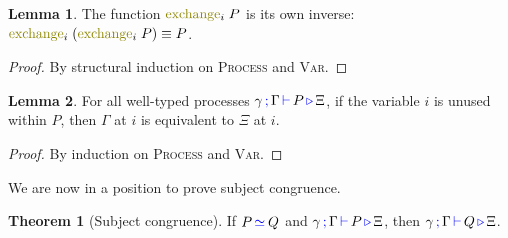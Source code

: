 \documentclass[sigplan,10pt,anonymous,review]{acmart}
\theoremstyle{definition}
\newtheorem{nitheorem}{Theorem}
\newtheorem{nilemma}{Lemma}
\newcommand{\type}[1]{\textcolor{blue}{\operatorname{#1}}}
\newcommand{\func}[1]{\textcolor{olive}{\operatorname{#1}}}
\newcommand{\types}[4]{#1 \, \type{;} \, #2 \, \type{\vdash} \, #3 \, \type{\triangleright} \, #4}
\newcommand{\eq}[1]{\, \type{\simeq}_{#1} \,}
\begin{document}
\begin{nilemma}
  \label{lm:exchange-exchange}
  The function $\func{exchange}_i \; P$ is its own inverse: $\func{exchange}_i \; (\func{exchange}_i \; P) \equiv P$.
\end{nilemma}
\begin{proof}
  By structural induction on \textsc{Process} and \textsc{Var}.
\end{proof}

\begin{nilemma}
  \label{lm:types-unused}
  For all well-typed processes $\types{\gamma}{\Gamma}{P}{\Xi}$, if the variable $i$ is unused within $P$, then $\Gamma$ at $i$ is equivalent to $\Xi$ at $i$.
\end{nilemma}
\begin{proof}
  By induction on \textsc{Process} and \textsc{Var}.
\end{proof}

We are now in a position to prove subject congruence.

\begin{nitheorem}[Subject congruence]
  \label{thm:subject-congruence}
  If $P \eq{} Q$ and $\types{\gamma}{\Gamma}{P}{\Xi}$, then $\types{\gamma}{\Gamma}{Q}{\Xi}$.
\end{nitheorem}
\end{document}
